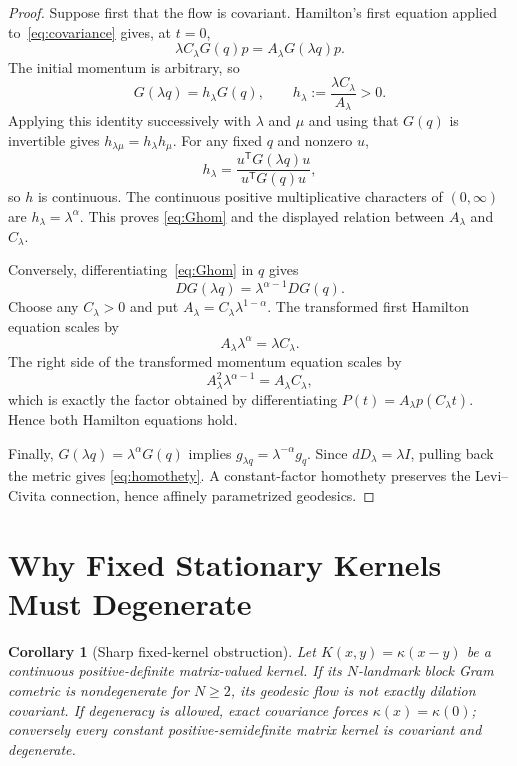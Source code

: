 \documentclass[11pt]{article}
\newtheorem{corollary}{Corollary}
\begin{document}
\begin{proof}
Suppose first that the flow is covariant.  Hamilton's first equation applied
to~\eqref{eq:covariance} gives, at \(t=0\),
\[
 \lambda C_\lambda G(q)p=A_\lambda G(\lambda q)p.
\]
The initial momentum is arbitrary, so
\[
 G(\lambda q)=h_\lambda G(q),
 \qquad h_\lambda:=\frac{\lambda C_\lambda}{A_\lambda}>0.
\]
Applying this identity successively with \(\lambda\) and \(\mu\) and using
that \(G(q)\) is invertible gives
\(h_{\lambda\mu}=h_\lambda h_\mu\).  For any fixed \(q\) and nonzero \(u\),
\[
 h_\lambda=
 \frac{u^{\mathsf T}G(\lambda q)u}{u^{\mathsf T}G(q)u},
\]
so \(h\) is continuous.  The continuous positive multiplicative characters
of \((0,\infty)\) are \(h_\lambda=\lambda^\alpha\).  This proves
\eqref{eq:Ghom} and the displayed relation between \(A_\lambda\) and
\(C_\lambda\).

Conversely, differentiating~\eqref{eq:Ghom} in \(q\) gives
\[
 DG(\lambda q)=\lambda^{\alpha-1}DG(q).
\]
Choose any \(C_\lambda>0\) and put
\(A_\lambda=C_\lambda\lambda^{1-\alpha}\).  The transformed first
Hamilton equation scales by
\[
 A_\lambda\lambda^\alpha=\lambda C_\lambda.
\]
The right side of the transformed momentum equation scales by
\[
 A_\lambda^2\lambda^{\alpha-1}
 =A_\lambda C_\lambda,
\]
which is exactly the factor obtained by differentiating
\(P(t)=A_\lambda p(C_\lambda t)\).  Hence both Hamilton equations hold.

Finally, \(G(\lambda q)=\lambda^\alpha G(q)\) implies
\(g_{\lambda q}=\lambda^{-\alpha}g_q\).  Since
\(dD_\lambda=\lambda I\), pulling back the metric gives
\eqref{eq:homothety}.  A constant-factor homothety preserves the
Levi--Civita connection, hence affinely parametrized geodesics.
\end{proof}

\section*{Why Fixed Stationary Kernels Must Degenerate}

\begin{corollary}[Sharp fixed-kernel obstruction]
\label{cor:fixed}
Let \(K(x,y)=\kappa(x-y)\) be a continuous positive-definite
matrix-valued kernel.  If its \(N\)-landmark block Gram cometric is
nondegenerate for \(N\geq2\), its geodesic flow is not exactly dilation
covariant.  If degeneracy is allowed, exact covariance forces
\(\kappa(x)=\kappa(0)\); conversely every constant positive-semidefinite
matrix kernel is covariant and degenerate.
\end{corollary}
\end{document}
